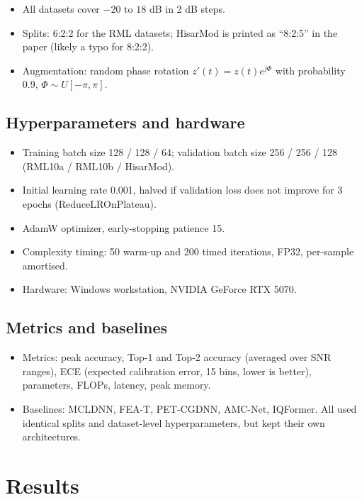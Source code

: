 \documentclass[11pt,a4paper]{article}
\begin{document}
\begin{itemize}
  \item All datasets cover $-20$ to $18$ dB in 2 dB steps.
  \item Splits: 6:2:2 for the RML datasets; HisarMod is printed as ``8:2:5'' in the paper (likely a typo for 8:2:2).
  \item Augmentation: random phase rotation $z'(t) = z(t)e^{j\Phi}$ with probability 0.9, $\Phi \sim U[-\pi,\pi]$.
\end{itemize}

\subsection{Hyperparameters and hardware}

\begin{itemize}
  \item Training batch size 128 / 128 / 64; validation batch size 256 / 256 / 128 (RML10a / RML10b / HisarMod).
  \item Initial learning rate 0.001, halved if validation loss does not improve for 3 epochs (ReduceLROnPlateau).
  \item AdamW optimizer, early-stopping patience 15.
  \item Complexity timing: 50 warm-up and 200 timed iterations, FP32, per-sample amortised.
  \item Hardware: Windows workstation, NVIDIA GeForce RTX 5070.
\end{itemize}

\subsection{Metrics and baselines}

\begin{itemize}
  \item Metrics: peak accuracy, Top-1 and Top-2 accuracy (averaged over SNR ranges), ECE (expected calibration error, 15 bins, lower is better), parameters, FLOPs, latency, peak memory.
  \item Baselines: MCLDNN, FEA-T, PET-CGDNN, AMC-Net, IQFormer. All used identical splits and dataset-level hyperparameters, but kept their own architectures.
\end{itemize}

\section{Results}
\end{document}
